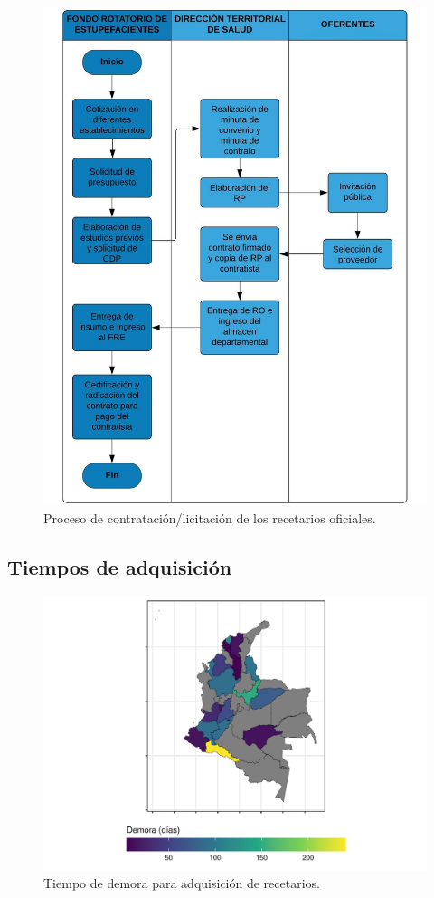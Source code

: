 \documentclass[
  oneside]{book}
\begin{document}
\begin{figure}

{\centering \includegraphics[width=0.8\linewidth]{figures/procesoContractual} 

}

\caption{Proceso de contratación/licitación de los recetarios oficiales.}\label{fig:procesoContractual}
\end{figure}

\hypertarget{tiempos-de-adquisiciuxf3n}{%
\subsection{Tiempos de adquisición}\label{tiempos-de-adquisiciuxf3n}}

\begin{figure}

{\centering \includegraphics[width=0.85\linewidth]{InformeFinal_files/figure-latex/tiempoDemoraAdquisicion-1} 

}

\caption{Tiempo de demora para adquisición de recetarios.}\label{fig:tiempoDemoraAdquisicion}
\end{figure}
\end{document}
